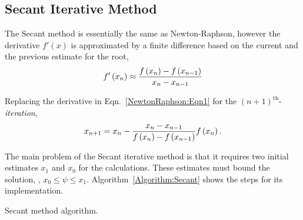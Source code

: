 \subsection{Secant Iterative Method}\label{Section:RootFinderMethods:Secant}
The Secant method is essentially the same as Newton-Raphson, however the derivative $f'(x)$ is approximated by a finite difference based on the current and the previous estimate for the root,
   \begin{displaymath}
       f'\left(x_{n}\right) \approx \displaystyle\frac{f\left(x_{n}\right) - f\left(x_{n-1}\right)}{x_{n}-x_{n-1}}
   \end{displaymath}

   \begin{shaded}
      Replacing the derivative in Eqn.~\ref{NewtonRaphson:Eqn1} for the $(n+1)^{\text{th}}$-{\it iteration},
         \begin{equation}
            x_{n+1} = x_{n} - \displaystyle\frac{ x_{n} - x_{n-1} }{f\left(x_{n}\right) - f\left(x_{n-1}\right)} f\left(x_{n}\right).\label{Secant:Eqn1}
         \end{equation}
   \end{shaded}
The main problem of the Secant iterative method is that it requires two initial estimates $x_{1}$ and $x_{0}$ for the calculations. These estimates must bound the solution, \ie, $x_{0} \leq \psi \leq x_{1}$. Algorithm~\ref{Algorithm:Secant} shows the steps for its implementation.


\begin{algorithm}[h]%



 \caption{Secant method algorithm.}\label{Algorithm:Secant}
\end{algorithm}

